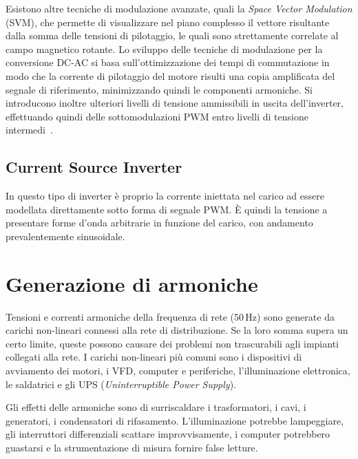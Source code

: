 Esistono altre tecniche di modulazione avanzate, quali la \textit{Space Vector Modulation} (SVM), che permette di visualizzare nel piano complesso il vettore risultante dalla somma delle tensioni di pilotaggio, le quali sono strettamente correlate al campo magnetico rotante. Lo sviluppo delle tecniche di modulazione per la conversione DC-AC si basa sull'ottimizzazione dei tempi di commutazione in modo che la corrente di pilotaggio del motore risulti una copia amplificata del segnale di riferimento, minimizzando quindi le componenti armoniche. Si introducono inoltre ulteriori livelli di tensione ammissibili in uscita dell'inverter, effettuando quindi delle sottomodulazioni PWM entro livelli di tensione intermedi~\cite{luo2005}.

\subsection{Current Source Inverter}

In questo tipo di inverter è proprio la corrente iniettata nel carico ad essere modellata direttamente sotto forma di segnale PWM. È quindi la tensione a presentare forme d'onda arbitrarie in funzione del carico, con andamento prevalentemente sinusoidale.

\section{Generazione di armoniche}

Tensioni e correnti armoniche della frequenza di rete (50\,Hz) sono generate da carichi non-lineari connessi alla rete di distribuzione. Se la loro somma supera un certo limite, queste possono causare dei problemi non trascurabili agli impianti collegati alla rete. I carichi non-lineari più comuni sono i dispositivi di avviamento dei motori, i VFD, computer e periferiche, l'illuminazione elettronica, le saldatrici e gli UPS (\textit{Uninterruptible Power Supply}).

Gli effetti delle armoniche sono di surriscaldare i trasformatori, i cavi, i generatori, i condensatori di rifasamento. L'illuminazione potrebbe lampeggiare, gli interruttori differenziali scattare improvvisamente, i computer potrebbero guastarsi e la strumentazione di misura fornire false letture.

